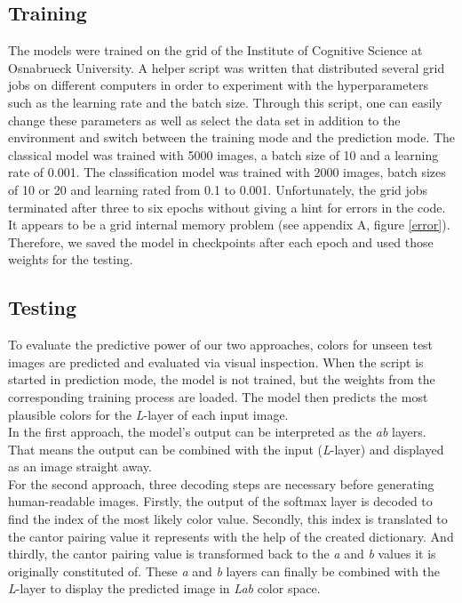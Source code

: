 \documentclass[12pt,letterpaper]{article}
\begin{document}
\subsection{Training}
The models were trained on the grid of the Institute of Cognitive Science at Osnabrueck University. A helper script was written that distributed several grid jobs on different computers in order to experiment with the hyperparameters such as the learning rate and the batch size. Through this script, one can easily change these parameters as well as select the data set in addition to the environment and switch between the training mode and the prediction mode. The classical model was trained with 5000 images, a batch size of 10 and a learning rate of 0.001. The classification model was trained with 2000 images, batch sizes of 10 or 20 and learning rated from 0.1 to 0.001. Unfortunately, the grid jobs terminated after three to six epochs without giving a hint for errors in the code. It appears to be a grid internal memory problem (see appendix A, figure \ref{error}). Therefore, we saved the model in checkpoints after each epoch and used those weights for the testing.

\subsection{Testing}
To evaluate the predictive power of our two approaches, colors for unseen test images are predicted and evaluated via visual inspection. When the script is started in prediction mode, the model is not trained, but the weights from the corresponding training process are loaded. The model then predicts the most plausible colors for the \emph{L}-layer of each input image.\\
In the first approach, the model's output can be interpreted as the \emph{ab} layers. That means the output can be combined with the input (\emph{L}-layer) and displayed as an image straight away.\\
For the second approach, three decoding steps are necessary before generating human-readable images. Firstly, the output of the softmax layer is decoded to find the index of the most likely color value. Secondly, this index is translated to the cantor pairing value it represents with the help of the created dictionary. And thirdly, the cantor pairing value is transformed back to the \emph{a} and \emph{b} values it is originally constituted of. These \emph{a} and \emph{b} layers can finally be combined with the \emph{L}-layer to display the predicted image in \emph{Lab} color space.
\end{document}
